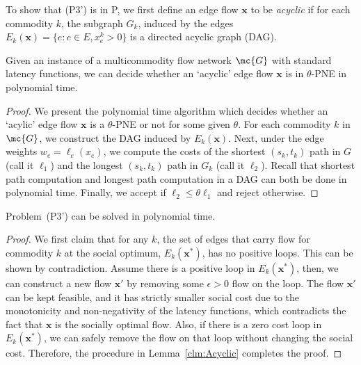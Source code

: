 To show that (P3') is in P, we first define an edge flow $\bm{x}$ to be \emph{acyclic} if for each commodity $k$, the subgraph $G_k$, induced by the edges $E_k(\bm{x}) = \{e: e\in E, x_e^k>0\} $ is a directed acyclic graph (DAG).
  
\begin{claim}
Given an instance of a multicommodity flow network $\mc{G}$ with standard latency functions, we can decide whether an `acyclic' edge flow $\bm{x}$ is in $\theta$-PNE in polynomial time.
\label{clm:Acyclic}
\end{claim}
\begin{proof}
We present the polynomial time algorithm which decides whether an `acylic' edge flow $\bm{x}$ is a $\theta$-PNE or not for some given $\theta$. For each commodity $k$ in $\mc{G}$, we construct the DAG induced by $E_k(\bm{x})$. Next, under the edge weights $w_e = \ell_e(x_e)$, we compute the costs of the shortest $(s_k, t_k)$ path in $G$ (call it $\ell_1$) and the longest $(s_k,t_k)$ path in $G_k$ (call it $\ell_2$).  Recall that shortest path computation and longest path computation in a DAG can both be done in polynomial time. Finally, we accept if $\ell_2 \leq \theta\ell_1$ and reject otherwise. 
\end{proof}

\begin{lemma}
Problem~(P3') can be solved in polynomial time.
\label{lemma:3Easy}
\end{lemma}
\begin{proof} 
We first claim that for any $k$, the set of edges that carry flow for commodity $k$ at the social optimum, $E_k(\bm{x}^*)$, has no positive loops.  This can be shown by contradiction.  Assume there is a positive loop in $E_k(\bm{x}^*)$, then, we can construct a new flow $\bm{x}'$ by removing some $\epsilon>0$ flow on the loop.  The flow $\bm{x}'$ can be kept feasible, and it has strictly smaller social cost due to the monotonicity and non-negativity of the latency functions, which contradicts the fact that $\bm{x}$ is the socially optimal flow.  Also, if there is a zero cost loop in $E_k(\bm{x}^*)$, we can safely remove the flow on that loop without changing the social cost. Therefore, the procedure in Lemma~\ref{clm:Acyclic} completes the proof. 
\end{proof}
